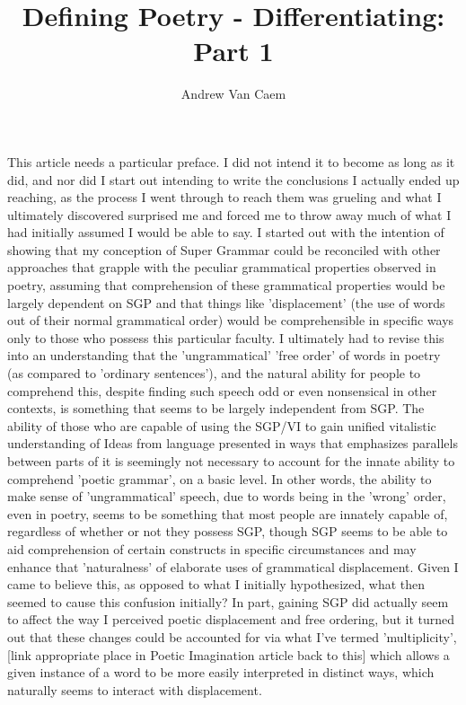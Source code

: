 \documentclass[]{article}
\title{Defining Poetry - Differentiating: Part 1}
\author{Andrew Van Caem}
\begin{document}
\maketitle

\section{}

This article needs a particular preface. I did not intend it to become as long as it did, and nor did I start out intending to write the conclusions I actually ended up reaching, as the process I went through to reach them was grueling and what I ultimately discovered surprised me and forced me to throw away much of what I had initially assumed I would be able to say. I started out with the intention of showing that my conception of Super Grammar could be reconciled with other approaches that grapple with the peculiar grammatical properties observed in poetry, assuming that comprehension of these grammatical properties would be largely dependent on SGP and that things like 'displacement' (the use of words out of their normal grammatical order) would be comprehensible in specific ways only to those who possess this particular faculty. I ultimately had to revise this into an understanding that the 'ungrammatical' 'free order' of words in poetry (as compared to 'ordinary sentences'), and the natural ability for people to comprehend this, despite finding such speech odd or even nonsensical in other contexts, is something that seems to be largely independent from SGP. The ability of those who are capable of using the SGP/VI to gain unified vitalistic understanding of Ideas from language presented in ways that emphasizes parallels between parts of it is seemingly not necessary to account for the innate ability to comprehend 'poetic grammar', on a basic level. In other words, the ability to make sense of 'ungrammatical' speech, due to words being in the 'wrong' order, even in poetry, seems to be something that most people are innately capable of, regardless of whether or not they possess SGP, though SGP seems to be able to aid comprehension of certain constructs in specific circumstances and may enhance that 'naturalness' of elaborate uses of grammatical displacement. Given I came to believe this, as opposed to what I initially hypothesized, what then seemed to cause this confusion initially? In part, gaining SGP did actually seem to affect the way I perceived poetic displacement and free ordering, but it turned out that these changes could be accounted for via what I've termed 'multiplicity', [link appropriate place in Poetic Imagination article back to this] which allows a given instance of a word to be more easily interpreted in distinct ways, which naturally seems to interact with displacement.\\
\end{document}
